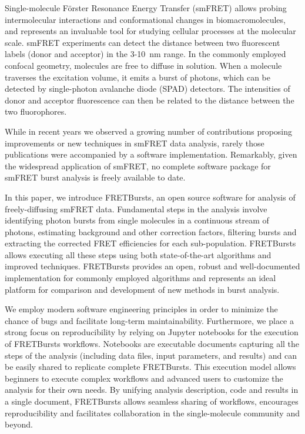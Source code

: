 Single-molecule Förster Resonance Energy Transfer (smFRET) allows
probing intermolecular interactions and conformational changes in
biomacromolecules, and represents an invaluable tool for studying
cellular processes at the molecular scale. smFRET experiments can
detect the distance between two fluorescent labels (donor and acceptor)
in the 3-10~nm range. In the commonly employed confocal geometry,
molecules are free to diffuse in solution. When a molecule traverses
the excitation volume, it emits a burst of photons, which can be detected
by single-photon avalanche diode (SPAD) detectors. The intensities of
donor and acceptor fluorescence can then be related to the distance
between the two fluorophores.

While in recent years we observed a growing number of contributions
proposing improvements or new techniques in smFRET data analysis,
rarely those publications were accompanied by a software implementation.
Remarkably, given the widespread application of smFRET, no complete
software package for smFRET burst analysis is freely available to date.

In this paper, we introduce FRETBursts, an open source software
for analysis of freely-diffusing smFRET data.
Fundamental steps in the analysis involve identifying photon bursts
from single molecules in a continuous stream of photons, estimating
background and other correction factors, filtering bursts and extracting
the corrected FRET efficiencies for each sub-population.
FRETBursts allows executing all these steps using both state-of-the-art
algorithms and improved techniques.
FRETBursts provides an open, robust and well-documented
implementation for commonly employed algorithms and represents
an ideal platform for comparison and development of new methods
in burst analysis.

We employ modern software engineering principles in order to
minimize the chance of bugs and facilitate long-term maintainability.
Furthermore, we place a strong focus on reproducibility by relying on
Jupyter notebooks for the execution of FRETBursts workflows.
Notebooks are executable documents capturing all the steps of the
analysis (including data files, input parameters, and results) and can
be easily shared to replicate complete FRETBursts.
This execution model allows beginners to execute complex workflows
and advanced users to customize the analysis for their own needs.
By unifying analysis description, code and results in a single document, 
FRETBursts allows seamless sharing of workflows, encourages
reproducibility and facilitates collaboration in the 
single-molecule community and beyond.
